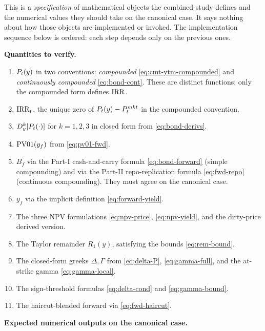 \documentclass[11pt,a4paper]{article}
\newcommand{\Bf}{B_f}
\newcommand{\dD}[1]{D_{y}^{#1}}
\begin{document}
\begin{validation}
This is a \emph{specification} of mathematical objects the combined
study defines and the numerical values they should take on the
canonical case. It says nothing about how those objects are
implemented or invoked. The implementation sequence below is
ordered: each step depends only on the previous ones.

\textbf{Quantities to verify.}
\begin{enumerate}[noitemsep]
\item $P_{t}(y)$ in two conventions: \emph{compounded}
      \eqref{eq:cmt-ytm-compounded} and \emph{continuously
      compounded} \eqref{eq:bond-cont}. These are distinct functions;
      only the compounded form defines $\mathrm{IRR}$.
\item $\mathrm{IRR}_t$, the unique zero of $P_{t}(y) - P^{mkt}_t$ in the
      compounded convention.
\item $\dD{k}[\Bond{t}{\cdot}]$ for $k=1,2,3$ in closed form
      from \eqref{eq:bond-derivs}.
\item $\mathrm{PV01}(y_f)$ from \eqref{eq:pv01-fwd}.
\item $\Bf$ via the Part-I cash-and-carry formula
      \eqref{eq:bond-forward} (simple compounding) and via the Part-II
      repo-replication formula \eqref{eq:fwd-repo} (continuous
      compounding). They must agree on the canonical case.
\item $y_f$ via the implicit definition \eqref{eq:forward-yield}.
\item The three NPV formulations \eqref{eq:npv-price},
      \eqref{eq:npv-yield}, and the dirty-price derived version.
\item The Taylor remainder $R_1(y)$, satisfying the bounds
      \eqref{eq:rem-bound}.
\item The closed-form greeks $\Delta, \Gamma$ from
      \eqref{eq:delta-P}, \eqref{eq:gamma-full}, and the at-strike
      gamma \eqref{eq:gamma-local}.
\item The sign-threshold formulas \eqref{eq:delta-cond} and
      \eqref{eq:gamma-bound}.
\item The haircut-blended forward via \eqref{eq:fwd-haircut}.
\end{enumerate}

\textbf{Expected numerical outputs on the canonical case.}


\end{validation}
\end{document}
